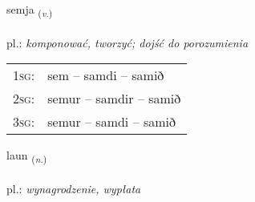 \documentclass[frontgrid, backgrid]{flacards}\usepackage[]{graphicx}\usepackage[]{xcolor}
\begin{document}
\renewcommand{\flhead}{\vskip5pt \fboxsep=0pt {\small\bfseries\footnotesize Sagnorð | czasownik}}
\renewcommand{\fcfoot}{\vskip5pt \fboxsep=0pt \hspace{2pt}{\small\bfseries\footnotesize 1K}}

\renewcommand{\blhead}{\vskip5pt {\small\bfseries\footnotesize Sagnorð | czasownik }}
\renewcommand{\bcfoot}{\vskip5pt \hspace{2pt}{\small\bfseries\footnotesize 1K}}


{semja \small{\textsubscript{(\textit{v.})}} \\[1ex] %
\textphonetic{[sɛmja]} \\
pl.: \emph{komponować, tworzyć; dojść do porozumienia} \\  [2ex]
\renewcommand*{\arraystretch}{0.8}
\begin{tabular}{p{1cm}l}
\textsc{1sg}: & sem -- samdi -- samið \\ 
\textsc{2sg}: & semur -- samdir -- samið \\ 
\textsc{3sg}: & semur -- samdi -- samið \\ 
\end{tabular}
}

\renewcommand{\flhead}{\vskip5pt \fboxsep=0pt {\small\bfseries\footnotesize Nafnorð | rzeczownik}}
\renewcommand{\fcfoot}{\vskip5pt \fboxsep=0pt \hspace{2pt}{\small\bfseries\footnotesize 1K}}

\renewcommand{\blhead}{\vskip5pt {\small\bfseries\footnotesize Nafnorð | rzeczownik }}
\renewcommand{\bcfoot}{\vskip5pt \hspace{2pt}{\small\bfseries\footnotesize 1K}}


{laun \small{\textsubscript{(\textit{n.})}} \\[1ex] %
\textphonetic{[lœiːn]} \\
pl.: \emph{wynagrodzenie, wypłata} \\  [2ex]
\renewcommand*{\arraystretch}{0.8}
}
\end{document}
